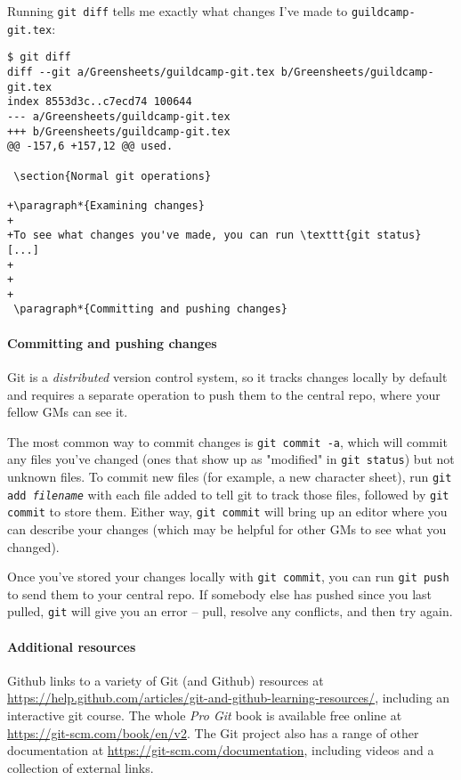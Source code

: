 \documentclass[green]{testgame}
\begin{document}
Running \texttt{git diff} tells me exactly what changes I've made to \texttt{guildcamp-git.tex}:
\begin{verbatim}
$ git diff
diff --git a/Greensheets/guildcamp-git.tex b/Greensheets/guildcamp-git.tex
index 8553d3c..c7ecd74 100644
--- a/Greensheets/guildcamp-git.tex
+++ b/Greensheets/guildcamp-git.tex
@@ -157,6 +157,12 @@ used.

 \section{Normal git operations}

+\paragraph*{Examining changes}
+
+To see what changes you've made, you can run \texttt{git status} [...]
+
+
+
 \paragraph*{Committing and pushing changes}
\end{verbatim}

\paragraph*{Committing and pushing changes}

Git is a \emph{distributed} version control system, so it tracks changes locally by default and requires a separate operation to push them to the central repo, where your fellow GMs can see it.

The most common way to commit changes is \texttt{git commit -a}, which will commit any files you've changed (ones that show up as "modified" in \texttt{git status}) but not unknown files. To commit new files (for example, a new character sheet), run \texttt{git add \emph{filename}} with each file added to tell git to track those files, followed by \texttt{git commit} to store them. Either way, \texttt{git commit} will bring up an editor where you can describe your changes (which may be helpful for other GMs to see what you changed).

Once you've stored your changes locally with \texttt{git commit}, you can run \texttt{git push} to send them to your central repo. If somebody else has pushed since you last pulled, \texttt{git} will give you an error -- pull, resolve any conflicts, and then try again.

\paragraph*{Additional resources}

Github links to a variety of Git (and Github) resources at \url{https://help.github.com/articles/git-and-github-learning-resources/}, including an interactive git course. The whole \emph{Pro Git} book is available free online at \url{https://git-scm.com/book/en/v2}. The Git project also has a range of other documentation at \url{https://git-scm.com/documentation}, including videos and a collection of external links.
\end{document}
